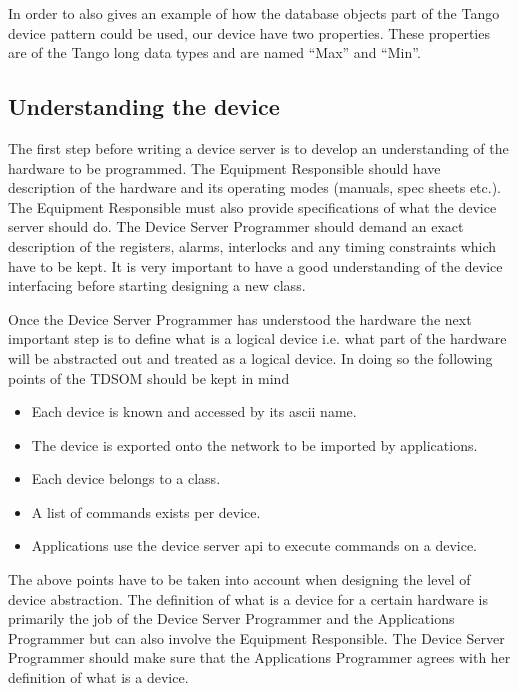 In order to also gives an example of how the database objects part
of the Tango device pattern could be used, our device have two properties.
These properties are of the Tango long data types and are named ``Max''
and ``Min''.

\subsection{Understanding the device}

The first step before writing a device server is to develop an understanding
of the hardware to be programmed. The Equipment Responsible should
have description of the hardware and its operating modes (manuals,
spec sheets etc.). The Equipment Responsible must also provide specifications
of what the device server should do. The Device Server Programmer
should demand an exact description of the registers, alarms, interlocks
and any timing constraints which have to be kept. It is very important
to have a good understanding of the device interfacing before starting
designing a new class. 

Once the Device Server Programmer has understood the hardware the
next important step is to define what is a logical device i.e. what
part of the hardware will be abstracted out and treated as a logical
device. In doing so the following points of the TDSOM should be kept
in mind 
\begin{itemize}
\item Each device is known and accessed by its ascii name.
\item The device is exported onto the network to be imported by applications.
\item Each device belongs to a class.
\item A list of commands exists per device.
\item Applications use the device server api to execute commands on a device. 
\end{itemize}
The above points have to be taken into account when designing the
level of device abstraction. The definition of what is a device for
a certain hardware is primarily the job of the Device Server Programmer
and the Applications Programmer but can also involve the Equipment
Responsible. The Device Server Programmer should make sure that the
Applications Programmer agrees with her definition of what is a device.

